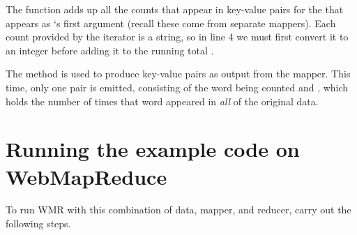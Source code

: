 \documentclass[letterpaper,10pt,openany,oneside]{sphinxmanual}
\begin{document}
The  function adds up all the counts that appear in
key-value pairs for the  that appears as `s
first argument (recall these come from separate mappers). Each
count provided by the iterator  is a string, so in line 4
we must first convert it to an integer before adding it to the
running total .

The method  is used to produce key-value pairs as
output from the mapper. This time, only one pair is emitted,
consisting of the word being counted and , which holds the
number of times that word appeared in \emph{all} of the original data.


\section{Running the example code on WebMapReduce}
\label{wmr_py/wmr_py:running-the-example-code-on-webmapreduce}
To run WMR with this combination of data, mapper, and reducer,
carry out the following steps.
\end{document}
